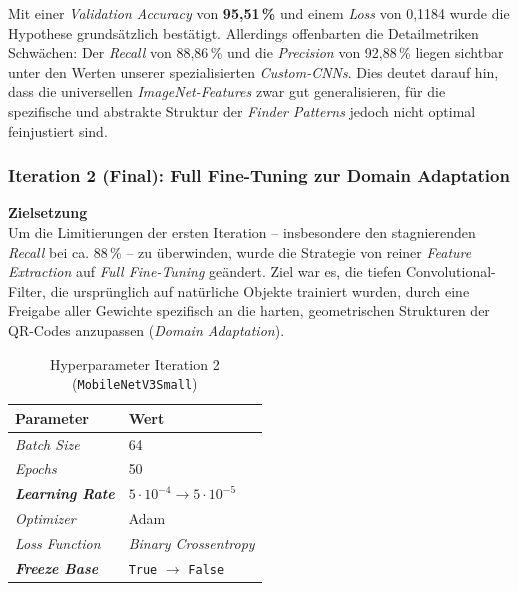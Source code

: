 \documentclass[
    a4paper,        %
    11pt,           %
    ngerman,        %
    parskip=half,   %
    listof=totoc,   %
    bibliography=totoc %
]{scrartcl}
\begin{document}
Mit einer \textit{Validation Accuracy} von \textbf{95,51\,\%} und einem \textit{Loss} von 0,1184 wurde die Hypothese grundsätzlich bestätigt. Allerdings offenbarten die Detailmetriken Schwächen: Der \textit{Recall} von 88,86\,\% und die \textit{Precision} von 92,88\,\% liegen sichtbar unter den Werten unserer spezialisierten \textit{Custom-CNNs}. Dies deutet darauf hin, dass die universellen \textit{ImageNet-Features} zwar gut generalisieren, für die spezifische und abstrakte Struktur der \textit{Finder Patterns} jedoch nicht optimal feinjustiert sind.

\subsubsection{Iteration 2 (Final): Full Fine-Tuning zur Domain Adaptation}

\textbf{Zielsetzung} \\
Um die Limitierungen der ersten Iteration – insbesondere den stagnierenden \textit{Recall} bei ca. 88\,\% – zu überwinden, wurde die Strategie von reiner \textit{Feature Extraction} auf \textit{Full Fine-Tuning} geändert. Ziel war es, die tiefen Convolutional-Filter, die ursprünglich auf natürliche Objekte trainiert wurden, durch eine Freigabe aller Gewichte spezifisch an die harten, geometrischen Strukturen der QR-Codes anzupassen (\textit{Domain Adaptation}).

\begin{table}[H]
    \centering
    \caption{Hyperparameter Iteration 2 (\texttt{MobileNetV3Small})}
    \label{tab:mnetv3s_hyperparams_iter2}
    \begin{tabular}{ll}
        \toprule
        \textbf{Parameter} & \textbf{Wert} \\
        \midrule
        \textit{Batch Size} & 64 \\
        \textit{Epochs} & 50 \\
        \textbf{\textit{Learning Rate}} & $5 \cdot 10^{-4} \rightarrow 5 \cdot 10^{-5}$ \\
        \textit{Optimizer} & Adam \\
        \textit{Loss Function} & \textit{Binary Crossentropy} \\
        \textbf{\textit{Freeze Base}} & \texttt{True} $\rightarrow$ \texttt{False} \\
        \bottomrule
    \end{tabular}
\end{table}
\end{document}

